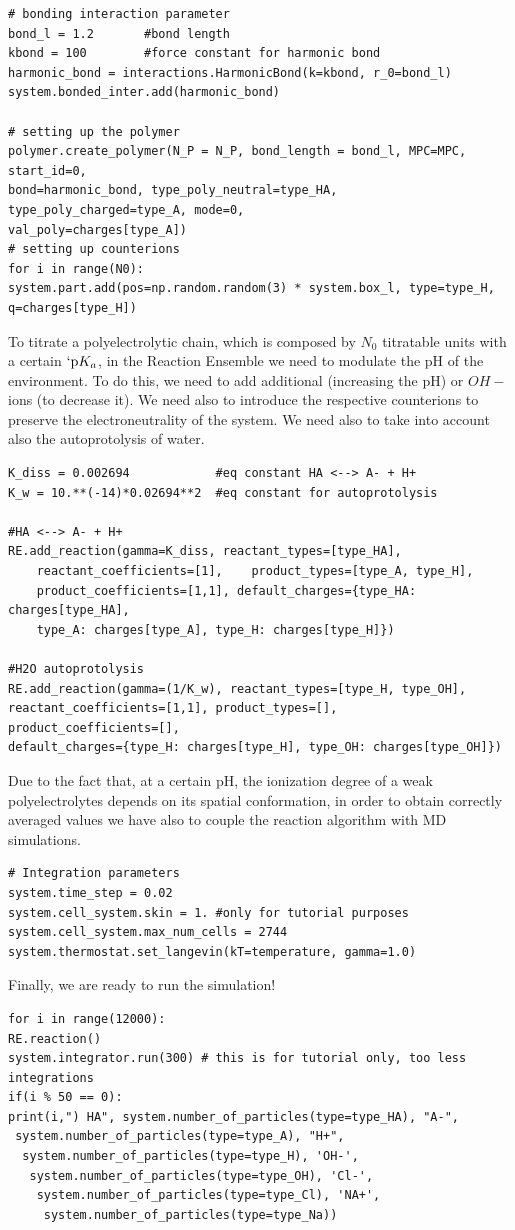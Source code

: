 \documentclass[
a4paper,                        %
11pt,                           %
twoside,                        %
footsepline,                    %
headsepline,                    %
headexclude,                    %
footexclude,                    %
pagesize,                       %
]{scrartcl}
\begin{document}
\begin{verbatim}
# bonding interaction parameter
bond_l = 1.2       #bond length
kbond = 100        #force constant for harmonic bond
harmonic_bond = interactions.HarmonicBond(k=kbond, r_0=bond_l)
system.bonded_inter.add(harmonic_bond)

# setting up the polymer
polymer.create_polymer(N_P = N_P, bond_length = bond_l, MPC=MPC, start_id=0, 
bond=harmonic_bond, type_poly_neutral=type_HA, type_poly_charged=type_A, mode=0,
val_poly=charges[type_A])
# setting up counterions
for i in range(N0):
system.part.add(pos=np.random.random(3) * system.box_l, type=type_H, q=charges[type_H])
\end{verbatim}

To titrate a polyelectrolytic chain, which is composed by $N_0$ titratable units with a certain $`\text{p}K_a$, in the Reaction Ensemble we need to modulate the pH of the environment. To do this, we need to add additional  (increasing the pH) or $OH-$ ions (to decrease it). We need also to introduce the respective counterions to preserve the electroneutrality of the system. We need also to take into account also the autoprotolysis of water.

\begin{verbatim}
K_diss = 0.002694            #eq constant HA <--> A- + H+
K_w = 10.**(-14)*0.02694**2  #eq constant for autoprotolysis

#HA <--> A- + H+
RE.add_reaction(gamma=K_diss, reactant_types=[type_HA],
    reactant_coefficients=[1],    product_types=[type_A, type_H], 
    product_coefficients=[1,1], default_charges={type_HA: charges[type_HA], 
    type_A: charges[type_A], type_H: charges[type_H]})

#H2O autoprotolysis 
RE.add_reaction(gamma=(1/K_w), reactant_types=[type_H, type_OH], 
reactant_coefficients=[1,1], product_types=[],    product_coefficients=[],    
default_charges={type_H: charges[type_H], type_OH: charges[type_OH]})
\end{verbatim}

Due to the fact that, at a certain pH, the ionization degree of a weak polyelectrolytes depends on its spatial conformation, in order to obtain  correctly averaged values we have also to couple the reaction algorithm with MD simulations. 

\begin{verbatim}
# Integration parameters
system.time_step = 0.02
system.cell_system.skin = 1. #only for tutorial purposes 
system.cell_system.max_num_cells = 2744
system.thermostat.set_langevin(kT=temperature, gamma=1.0)
\end{verbatim}
Finally, we are ready to run the simulation!
\begin{verbatim}
for i in range(12000):
RE.reaction()
system.integrator.run(300) # this is for tutorial only, too less integrations
if(i % 50 == 0):
print(i,") HA", system.number_of_particles(type=type_HA), "A-",
 system.number_of_particles(type=type_A), "H+",
  system.number_of_particles(type=type_H), 'OH-',
   system.number_of_particles(type=type_OH), 'Cl-',
    system.number_of_particles(type=type_Cl), 'NA+',
     system.number_of_particles(type=type_Na))
\end{verbatim}
\end{document}
